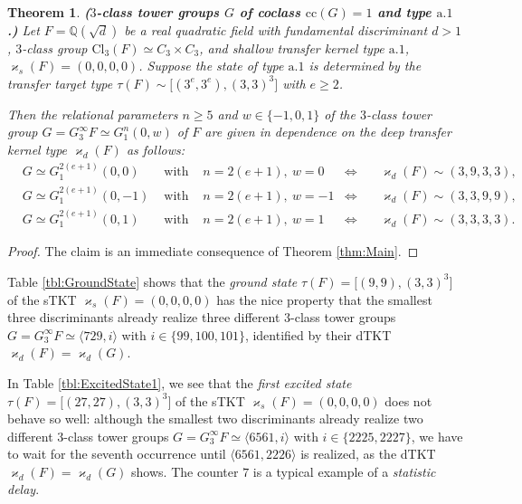 \documentclass{amsart}
\newtheorem{theorem}{Theorem}[section]
\theoremstyle{definition}
\numberwithin{equation}{section}
\begin{document}

\begin{theorem}
\label{thm:ArithmeticMain}
\textbf{(\(3\)-class tower groups \(G\) of coclass \(\mathrm{cc}(G)=1\) and type \(\mathrm{a}.1\).)}
Let \(F=\mathbb{Q}(\sqrt{d})\) be a real quadratic field
with fundamental discriminant \(d>1\),
\(3\)-class group \(\mathrm{Cl}_3(F)\simeq C_3\times C_3\),
and shallow transfer kernel type \(\mathrm{a}.1\), \(\varkappa_s(F)=(0,0,0,0)\).
Suppose the state of type \(\mathrm{a}.1\) is determined by the transfer target type
\(\tau(F)\sim\lbrack (3^e,3^e),(3,3)^3\rbrack\) with \(e\ge 2\).

Then the relational parameters \(n\ge 5\) and \(w\in\lbrace -1,0,1\rbrace\)
of the \(3\)-class tower group \(G=G_3^\infty{F}\simeq G_1^n(0,w)\) of \(F\)
are given in dependence on the deep transfer kernel type \(\varkappa_d(F)\) as follows:
\begin{equation}
\label{eqn:ArithmeticMain}
\begin{aligned}
& G\simeq G_1^{2(e+1)}(0,0)  & \text{ with } & n=2(e+1),\ w=0  & \Longleftrightarrow & \quad\varkappa_d(F)\sim (3,9,3,3), \\
& G\simeq G_1^{2(e+1)}(0,-1) & \text{ with } & n=2(e+1),\ w=-1 & \Longleftrightarrow & \quad\varkappa_d(F)\sim (3,3,9,9), \\
& G\simeq G_1^{2(e+1)}(0,1)  & \text{ with } & n=2(e+1),\ w=1  & \Longleftrightarrow & \quad\varkappa_d(F)\sim (3,3,3,3).
\end{aligned}
\end{equation}
\end{theorem}

\begin{proof}
The claim is an immediate consequence of Theorem
\ref{thm:Main}.
\end{proof}


Table
\ref{tbl:GroundState}
shows that the \textit{ground state} \(\tau(F)=\lbrack (9,9),(3,3)^3\rbrack\)
of the sTKT \(\varkappa_s(F)=(0,0,0,0)\) has the nice property that
the smallest three discriminants already realize three different \(3\)-class tower groups
\(G=G_3^\infty{F}\simeq\langle 729,i\rangle\) with \(i\in\lbrace 99,100,101\rbrace\),
identified by their dTKT \(\varkappa_d(F)=\varkappa_d(G)\).

In Table
\ref{tbl:ExcitedState1},
we see that the \textit{first excited state} \(\tau(F)=\lbrack (27,27),(3,3)^3\rbrack\)
of the sTKT \(\varkappa_s(F)=(0,0,0,0)\) does not behave so well:
although the smallest two discriminants
\cite{Ma1,Ma3,Ma14,Ma14b}
already realize two different \(3\)-class tower groups
\(G=G_3^\infty{F}\simeq\langle 6561,i\rangle\) with \(i\in\lbrace 2225,2227\rbrace\),
we have to wait for the seventh occurrence until \(\langle 6561,2226\rangle\) is realized,
as the dTKT \(\varkappa_d(F)=\varkappa_d(G)\) shows.
The counter \(7\) is a typical example of a \textit{statistic delay}.
\end{document}
